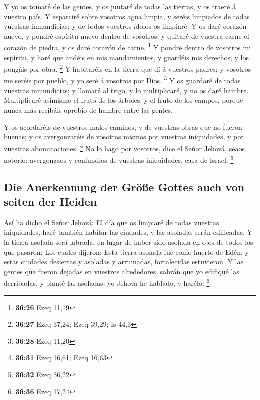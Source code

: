  Y yo os tomaré de las gentes, y os juntaré de todas las
tierras, y os traeré á vuestro país.  Y esparciré sobre
vosotros agua limpia, y seréis limpiados de todas vuestras inmundicias;
y de todos vuestros ídolos os limpiaré.  Y os daré corazón
nuevo, y pondré espíritu nuevo dentro de vosotros; y quitaré de vuestra
carne el corazón de piedra, y os daré corazón de carne. \footnote{\textbf{36:26}
  Ezeq 11,19}  Y pondré dentro de vosotros mi espíritu, y
haré que andéis en mis mandamientos, y guardéis mis derechos, y los
pongáis por obra. \footnote{\textbf{36:27} Ezeq 37,24; Ezeq 39,29; Is
  44,3}  Y habitaréis en la tierra que dí á vuestros
padres; y vosotros me seréis por pueblo, y yo seré á vosotros por Dios.
\footnote{\textbf{36:28} Ezeq 11,20}  Y os guardaré de
todas vuestras inmundicias; y llamaré al trigo, y lo multiplicaré, y no
os daré hambre.  Multiplicaré asimismo el fruto de los
árboles, y el fruto de los campos, porque nunca más recibáis oprobio de
hambre entre las gentes.

 Y os acordaréis de vuestros malos caminos, y de vuestras
obras que no fueron buenas; y os avergonzaréis de vosotros mismos por
vuestras iniquidades, y por vuestras abominaciones. \footnote{\textbf{36:31}
  Ezeq 16,61; Ezeq 16,63}  No lo hago por vosotros, dice el
Señor Jehová, séaos notorio: avergonzaos y confundíos de vuestras
iniquidades, casa de Israel. \footnote{\textbf{36:32} Ezeq 36,22}

\hypertarget{die-anerkennung-der-gruxf6uxdfe-gottes-auch-von-seiten-der-heiden}{%
\subsection{Die Anerkennung der Größe Gottes auch von seiten der
Heiden}\label{die-anerkennung-der-gruxf6uxdfe-gottes-auch-von-seiten-der-heiden}}

 Así ha dicho el Señor Jehová: El día que os limpiaré de
todas vuestras iniquidades, haré también habitar las ciudades, y las
asoladas serán edificadas.  Y la tierra asolada será
labrada, en lugar de haber sido asolada en ojos de todos los que
pasaron;  Los cuales dijeron: Esta tierra asolada fué como
huerto de Edén; y estas ciudades desiertas y asoladas y arruinadas,
fortalecidas estuvieron.  Y las gentes que fueron dejadas
en vuestros alrededores, sabrán que yo edifiqué las derribadas, y planté
las asoladas: yo Jehová he hablado, y harélo. \footnote{\textbf{36:36}
  Ezeq 17,24}

